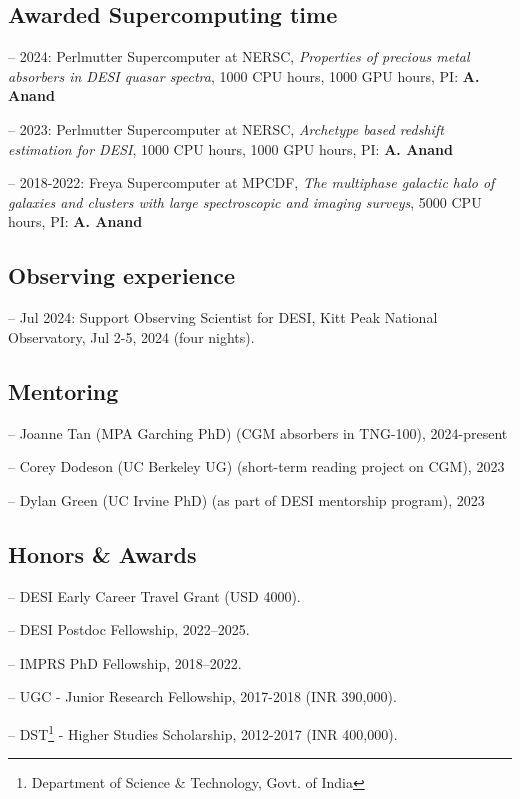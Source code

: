 \documentclass[12pt,letterpaper]{article}
\begin{document}
\subsection{Awarded Supercomputing time}
\begin{list}{}{\cvlist}
\item -- 2024: Perlmutter Supercomputer at NERSC, \textit{Properties of precious metal absorbers in DESI quasar spectra}, 1000 CPU hours, 1000 GPU hours, PI: \textbf{A. Anand}
\item -- 2023: Perlmutter Supercomputer at NERSC,  \textit{Archetype based redshift estimation for DESI}, 1000 CPU hours, 1000 GPU hours, PI: \textbf{A. Anand}
\item -- 2018-2022: Freya Supercomputer at MPCDF,  \textit{The multiphase galactic halo of galaxies and clusters with large spectroscopic and imaging surveys}, 5000 CPU hours, PI: \textbf{A. Anand}
\end{list}

\subsection{Observing experience}
\begin{list}{}{\cvlist}
\item -- Jul 2024: Support Observing Scientist for DESI, Kitt Peak National Observatory, Jul 2-5, 2024 (four nights).
\end{list}

\subsection{Mentoring}
\begin{list}{}{\cvlist}
\item -- Joanne Tan (MPA Garching PhD) (CGM absorbers in TNG-100), 2024-present
\item -- Corey Dodeson (UC Berkeley UG) (short-term reading project on CGM), 2023
\item -- Dylan Green (UC Irvine PhD) (as part of DESI mentorship program), 2023
\end{list}

\subsection{Honors \& Awards}
\begin{list}{}{\cvlist}
  \item -- DESI Early Career Travel Grant (USD 4000).
  \item -- DESI Postdoc Fellowship, 2022--2025.
  \item -- IMPRS PhD Fellowship, 2018--2022.
  \item -- UGC - Junior Research Fellowship, 2017-2018 (INR 390,000).
  \item -- DST\footnote{Department of Science \& Technology, Govt. of India} - Higher Studies Scholarship, 2012-2017 (INR 400,000).
\end{list}
\end{document}
